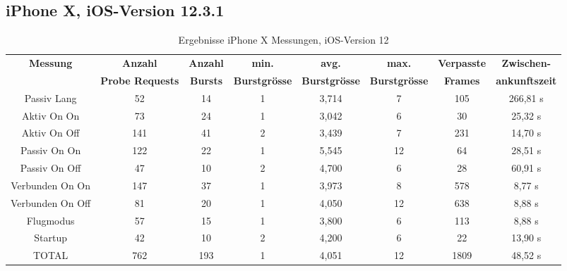 \begin{landscape}
   \subsection*{iPhone X, iOS-Version 12.3.1}
   \begin{table}[h!]
      \centering
      \begin{tabular}{|c|c|c|c|c|c|c|c|}
      \hline
      \textbf{Messung} & \textbf{Anzahl} & \textbf{Anzahl} & \textbf{min.} & \textbf{avg.} & \textbf{max.} & \textbf{Verpasste} & \textbf{Zwischen-}\\
      & \textbf{Probe Requests} & \textbf{Bursts} & \textbf{Burstgrösse} & \textbf{Burstgrösse} & \textbf{Burstgrösse} & \textbf{Frames} & \textbf{ankunftszeit}\\
      \hline
      Passiv Lang & \phantom{0}52 & \phantom{0}14 & 1 & 3,714 & \phantom{0}7 & \phantom{0}105 & 266,81 s \\
      Aktiv On On & \phantom{0}73 & \phantom{0}24 & 1 & 3,042 & \phantom{0}6 & \phantom{00}30 & \phantom{0}25,32 s \\
      Aktiv On Off & 141 & \phantom{0}41 & 2 & 3,439 & \phantom{0}7 & \phantom{0}231 & \phantom{0}14,70 s\\
      Passiv On On & 122 & \phantom{0}22 & 1 & 5,545 & 12 & \phantom{00}64 & \phantom{0}28,51 s \\
      Passiv On Off & \phantom{0}47 & \phantom{0}10 & 2 & 4,700 & \phantom{0}6 & \phantom{00}28 & \phantom{0}60,91 s \\
      Verbunden On On & 147 & \phantom{0}37 & 1 & 3,973 & \phantom{0}8 & \phantom{0}578 & \phantom{00}8,77 s \\
      Verbunden On Off & \phantom{0}81 & \phantom{0}20 & 1 & 4,050 & 12 & \phantom{0}638 & \phantom{00}8,88 s \\
      Flugmodus & \phantom{0}57 & \phantom{0}15 & 1 & 3,800 & \phantom{0}6 & \phantom{0}113 & \phantom{00}8,88 s \\
      Startup & \phantom{0}42 & \phantom{0}10 & 2 & 4,200 & \phantom{0}6 & \phantom{00}22 & \phantom{0}13,90 s \\
      \hline
      TOTAL & 762 & 193 & 1 & 4,051 & 12 & 1809 & \phantom{0}48,52 s\\
      \hline
      \end{tabular}
      \caption{Ergebnisse iPhone X Messungen, iOS-Version 12
      \label{table:iphoneX-12-results}} 
   \end{table}

   \clearpage 
      

\end{landscape}
